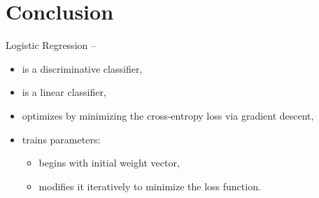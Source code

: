 \documentclass[
	number={4},
	title={Logistic Regression}
]{cs584notes}
\begin{document}
\section{Conclusion}\label{sec:conclusion}
Logistic Regression --
\begin{itemize}
	\item is a discriminative classifier,
	\item is a linear classifier,
	\item optimizes by minimizing the cross-entropy loss via gradient descent,
	\item trains parameters:
	\begin{itemize}
		\item begins with initial weight vector,
		\item modifies it iteratively to minimize the loss function.
	\end{itemize}
\end{itemize}
\end{document}
